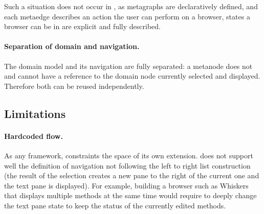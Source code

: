 \documentclass[a4paper,10pt,twoside]{book}
\begin{document}
Such a situation does not occur in \obf, as metagraphs are declaratively defined, and each metaedge describes an action the user can perform on a browser, states a browser can be in are explicit and fully described.

\paragraph{Separation of domain and navigation.} The domain model and its navigation are fully separated: a metanode does not and cannot have a reference to the domain node currently selected and displayed. Therefore both can be reused independently.

\subsection{Limitations} 

\paragraph{Hardcoded flow.} As any framework, \obf constraints the space of its own extension. \obf does not support well the definition of navigation not following the left  to right list construction (the result of the selection creates a new pane to the right of the current one and  the text pane is displayed). For example, building a browser such as Whiskers that displays multiple methods at the same time would require to deeply change the text pane state to keep the status of the currently edited methods. 


\end{document}
